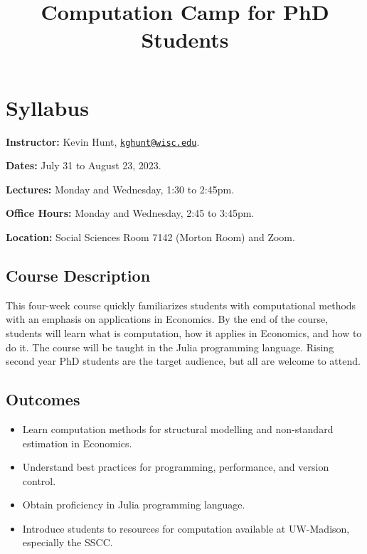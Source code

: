 \documentclass[
]{book}
\title{Computation Camp for PhD Students}
\author{}
\date{\vspace{-2.5em}}
\providecommand{\tightlist}{%
  \setlength{\itemsep}{0pt}\setlength{\parskip}{0pt}}
\begin{document}
\maketitle

{
\setcounter{tocdepth}{1}
\tableofcontents
}
\hypertarget{syllabus}{%
\chapter{Syllabus}\label{syllabus}}

\textbf{Instructor:} Kevin Hunt, \href{mailto:kghunt@wisc.edu}{\nolinkurl{kghunt@wisc.edu}}.

\textbf{Dates:} July 31 to August 23, 2023.

\textbf{Lectures:} Monday and Wednesday, 1:30 to 2:45pm.

\textbf{Office Hours:} Monday and Wednesday, 2:45 to 3:45pm.

\textbf{Location:} Social Sciences Room 7142 (Morton Room) and Zoom.

\hypertarget{course-description}{%
\section{Course Description}\label{course-description}}

This four-week course quickly familiarizes students with computational methods with an emphasis on applications in Economics. By the end of the course, students will learn what is computation, how it applies in Economics, and how to do it. The course will be taught in the Julia programming language. Rising second year PhD students are the target audience, but all are welcome to attend.

\hypertarget{outcomes}{%
\section{Outcomes}\label{outcomes}}

\begin{itemize}
\tightlist
\item
  Learn computation methods for structural modelling and non-standard estimation in Economics.
\item
  Understand best practices for programming, performance, and version control.
\item
  Obtain proficiency in Julia programming language.
\item
  Introduce students to resources for computation available at UW-Madison, especially the SSCC.
\end{itemize}
\end{document}
